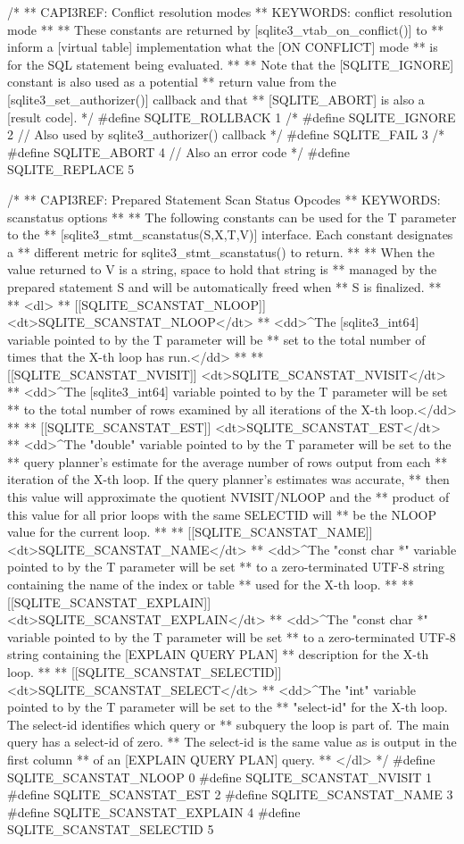 \begin{Codex}[label=sqlite3.h,numbers=left]
{/*
** CAPI3REF: Conflict resolution modes
** KEYWORDS: {conflict resolution mode}
**
** These constants are returned by [sqlite3_vtab_on_conflict()] to
** inform a [virtual table] implementation what the [ON CONFLICT] mode
** is for the SQL statement being evaluated.
**
** Note that the [SQLITE_IGNORE] constant is also used as a potential
** return value from the [sqlite3_set_authorizer()] callback and that
** [SQLITE_ABORT] is also a [result code].
*/
#define SQLITE_ROLLBACK 1
/* #define SQLITE_IGNORE 2 // Also used by sqlite3_authorizer() callback */
#define SQLITE_FAIL     3
/* #define SQLITE_ABORT 4  // Also an error code */
#define SQLITE_REPLACE  5

/*
** CAPI3REF: Prepared Statement Scan Status Opcodes
** KEYWORDS: {scanstatus options}
**
** The following constants can be used for the T parameter to the
** [sqlite3_stmt_scanstatus(S,X,T,V)] interface.  Each constant designates a
** different metric for sqlite3_stmt_scanstatus() to return.
**
** When the value returned to V is a string, space to hold that string is
** managed by the prepared statement S and will be automatically freed when
** S is finalized.
**
** <dl>
** [[SQLITE_SCANSTAT_NLOOP]] <dt>SQLITE_SCANSTAT_NLOOP</dt>
** <dd>^The [sqlite3_int64] variable pointed to by the T parameter will be
** set to the total number of times that the X-th loop has run.</dd>
**
** [[SQLITE_SCANSTAT_NVISIT]] <dt>SQLITE_SCANSTAT_NVISIT</dt>
** <dd>^The [sqlite3_int64] variable pointed to by the T parameter will be set
** to the total number of rows examined by all iterations of the X-th loop.</dd>
**
** [[SQLITE_SCANSTAT_EST]] <dt>SQLITE_SCANSTAT_EST</dt>
** <dd>^The "double" variable pointed to by the T parameter will be set to the
** query planner's estimate for the average number of rows output from each
** iteration of the X-th loop.  If the query planner's estimates was accurate,
** then this value will approximate the quotient NVISIT/NLOOP and the
** product of this value for all prior loops with the same SELECTID will
** be the NLOOP value for the current loop.
**
** [[SQLITE_SCANSTAT_NAME]] <dt>SQLITE_SCANSTAT_NAME</dt>
** <dd>^The "const char *" variable pointed to by the T parameter will be set
** to a zero-terminated UTF-8 string containing the name of the index or table
** used for the X-th loop.
**
** [[SQLITE_SCANSTAT_EXPLAIN]] <dt>SQLITE_SCANSTAT_EXPLAIN</dt>
** <dd>^The "const char *" variable pointed to by the T parameter will be set
** to a zero-terminated UTF-8 string containing the [EXPLAIN QUERY PLAN]
** description for the X-th loop.
**
** [[SQLITE_SCANSTAT_SELECTID]] <dt>SQLITE_SCANSTAT_SELECT</dt>
** <dd>^The "int" variable pointed to by the T parameter will be set to the
** "select-id" for the X-th loop.  The select-id identifies which query or
** subquery the loop is part of.  The main query has a select-id of zero.
** The select-id is the same value as is output in the first column
** of an [EXPLAIN QUERY PLAN] query.
** </dl>
*/
#define SQLITE_SCANSTAT_NLOOP    0
#define SQLITE_SCANSTAT_NVISIT   1
#define SQLITE_SCANSTAT_EST      2
#define SQLITE_SCANSTAT_NAME     3
#define SQLITE_SCANSTAT_EXPLAIN  4
#define SQLITE_SCANSTAT_SELECTID 5

}
\end{Codex}
